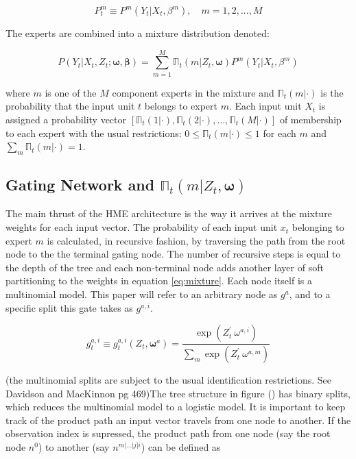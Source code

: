 \documentclass[12pt]{article}
\begin{document}
\begin{equation} \label{eq:ConditionalDistribution}
  P^{m}_{t} \equiv P^{m}(Y_{t}|X_{t}, \beta^{m}), \quad m = 1,2,...,M
\end{equation}

The experts are combined into a mixture distribution denoted:

\begin{equation} \label{eq:mixture}
  P(Y_{t}|X_{t}, Z_{t}; \boldsymbol{\omega}, \boldsymbol{\beta}) = \sum_{m=1}^{M}\mathbb{\Pi}_{t}(m | Z_{t}, \boldsymbol{\omega})P^{m}(Y_{t} | X_{t},\beta^{m})
\end{equation}

where $m$ is one of the $M$ component experts in the mixture and
$\mathbb{\Pi}_{t}(m | \cdot)$ is the probability that the input unit $t$ belongs
to expert $m$. Each input unit $X_{t}$ is assigned a probability vector
$[\mathbb{\Pi}_{t}(1 | \cdot), \mathbb{\Pi}_{t}(2 | \cdot), \ldots, \mathbb{\Pi}_{t}(M | \cdot)]$
of membership to each expert with the usual restrictions:
$0 \leq \mathbb{\Pi}_{t}(m | \cdot) \leq 1$ for each $m$ and
$\sum_{m} \mathbb{\Pi}_{t}(m | \cdot) = 1$.

\subsection{Gating Network and $\mathbb{\Pi}_{t}(m | Z_{t}, \boldsymbol{\omega})$}
The main thrust of the HME architecture is the way it arrives at the mixture
weights for each input vector. The probability of each input unit $x_{t}$
belonging to expert $m$ is calculated, in recursive fashion, by traversing the
path from the root node to the the terminal gating node. The number of
recursive steps is equal to the depth of the tree and each non-terminal node
adds another layer of soft partitioning to the weights in equation 
\ref{eq:mixture}. Each node itself is a multinomial model. This paper will 
refer to an arbitrary node as $g^{a}$, and to a specific split this gate
takes as $g^{a,i}$.

\begin{equation} \label{eq:softmax}
  g^{a,i}_{t} \equiv g^{a,i}_{t}(Z_{t}, \boldsymbol{\omega}^{a}) = \frac{\exp(Z_{t}^{\prime} \ \omega^{a,i})}{\sum_{m}{\exp(Z_{t}^{\prime} \ \omega^{a,m})}}
\end{equation}

(the multinomial splits are subject to the usual identification restrictions.
See Davidson and MacKinnon pg 469)The tree structure in figure () has binary
splits, which reduces the multinomial model to a logistic model. It is important
to keep track of the product
path an input vector travels from one node to another. If the observation index is
supressed, the product path from one node (say the root node $n^{0}$) to
another (say $n^{m|\ldots|j|i}$) can be defined as
\end{document}
